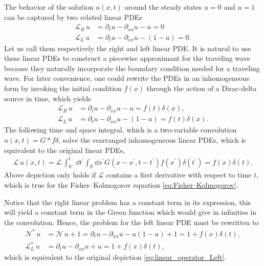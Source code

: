 \documentclass[amsmath,amssymb,amsfonts,aps,pre,preprint,superscriptaddress,bibnotes,showpacs,showkeys,longbibliography]{revtex4-1}
\newcommand*{\lop}{\mathcal{L}\,}
\newcommand{\pa}{\partial}
\begin{document}
The behavior of the solution $u(x,t)$ around the steady states $u=0$ and $u=1$ can be captured by two related linear PDEs
\begin{align}
\label{eq:linear_operator_Right}
    \mathcal{L}_R \, u &= \partial_t u -\partial_{xx}u - u=0\\
    \mathcal{L}_L \,  u &=\partial_t u -\partial_{xx}u - (1-u)=0.
    \label{eq:linear_operator_Left}
\end{align}
Let us call them respectively the right and left linear PDE. It is natural to use these linear PDEs to construct a piecewise approximant for the traveling wave because they naturally incorporate the boundary condition needed for a traveling wave. For later convenience, one could rewrite the PDEs in an inhomogeneous form by invoking the initial condition $f(x)$ through the action of a Dirac-delta source in time, which yields
\begin{align}
\label{eq:linear_operator_Right_Alt}
    \mathcal{L}_R \, u &= \partial_t u -\partial_{xx}u - u=f(t)\delta(x),\\
    \mathcal{L}_L \,  u &=\partial_t u -\partial_{xx}u - (1-u)=f(t)\delta(x).
    \label{eq:linear_operator_Left_Alt}
\end{align}
The following time and space integral, which is a two-variable convolution $u(x, t) = G \ast f \delta$, solve the rearranged inhomogeneous linear PDEs, which is equivalent to the original linear PDEs,
\begin{align}
 \label{eq:rewriten_linear_operator_delta_u}
	\lop u(x, t)=\lop \int_{0^{-}}^{t} \dd{t^{\prime}} \int_{\mathbb{R}} \dd{x^{\prime}} G\left(x-x^{\prime}, t-t^{\prime}\right) f\left(x^{\prime}\right) \delta\left(t^{\prime}\right)=f(x) \delta(t).
\end{align}
Above depiction only holds if $\mathcal{L}$ contains a first derivative with respect to time $t$, which is true for the Fisher–Kolmogorov equation \eqref{eq:Fisher–Kolmogorov}. 

Notice that the right linear problem has a constant term in its expression, this will yield a constant term in the Green function which would give in infinities in the convolution. Hence, the problem for the left linear PDE must be rewritten to
\begin{align}\label{eq:modified_nonlinear_operator_Left}
    \mathcal{N}^*\, u &=\mathcal{N}\, u+1= \pa_t u -\pa_{xx}u - u(1-u)+1=1+f(x)\delta(t),\\
    \mathcal{L}^*_L \, u &=\pa_t u -\pa_{xx}u +u=1+f(x)\delta(t),
    \label{eq:modified_linear_operator_Left}
\end{align}
which is equivalent to the original depiction \eqref{eq:linear_operator_Left}.
\end{document}
